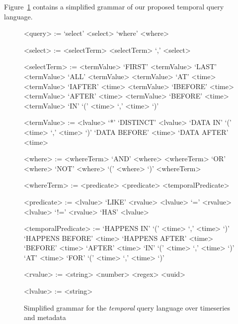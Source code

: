 Figure~\ref{fig:temporalgrammar} contains a simplified grammar of our proposed temporal query language.

\setlength{\grammarindent}{8em}
\setlength{\grammarparsep}{4pt}
\begin{figure}
\centering
\begin{grammar}
<query> := `select' <select> `where' <where>

<select> := <selectTerm>
\alt <selectTerm> `,' <select>

<selectTerm> := <termValue>
\alt `FIRST' <termValue>
\alt `LAST' <termValue>
\alt `ALL' <termValue>
\alt <termValue> `AT' <time>
\alt <termValue> `IAFTER' <time>
\alt <termValue> `IBEFORE' <time>
\alt <termValue> `AFTER' <time>
\alt <termValue> `BEFORE' <time>
\alt <termValue> `IN' `(' <time> `,' <time> `)'

<termValue> := <lvalue>
\alt `*'
\alt `DISTINCT' <lvalue>
\alt `DATA IN' `(' <time> `,' <time> `)'
\alt `DATA BEFORE' <time>
\alt `DATA AFTER' <time>

<where> := <whereTerm> `AND' <where>
\alt <whereTerm> `OR' <where>
\alt `NOT' <where>
\alt `(' <where> `)'
\alt <whereTerm>

<whereTerm> := <predicate>
\alt <predicate> <temporalPredicate>

<predicate> := <lvalue> `LIKE' <rvalue>
\alt <lvalue> `=' <rvalue>
\alt <lvalue> `!=' <rvalue>
\alt `HAS' <lvalue>

<temporalPredicate> := `HAPPENS IN' `(' <time> `,' <time> `)'
\alt `HAPPENS BEFORE' <time>
\alt `HAPPENS AFTER' <time>
\alt `BEFORE' <time>
\alt `AFTER' <time>
\alt `IN' `(' <time> `,' <time> `)'
\alt `AT' <time>
\alt `FOR' `(' <time> `,' <time> `)'

<rvalue> := <string>
\alt <number>
\alt <regex>
\alt <uuid>

<lvalue> := <string>
\end{grammar}
\caption{Simplified grammar for the \emph{temporal} query language over timeseries and metadata}
\label{fig:temporalgrammar}
\end{figure}


